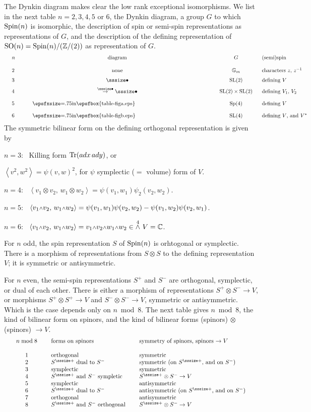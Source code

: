 The Dynkin diagram makes clear the low rank exceptional
isomorphisms.
We list in the next table $n=2,3,4,5$ or $6$, the Dynkin
diagram, a group $G$ to which $\text{\rm Spin}(n)$ is isomorphic,
the description of spin or semi-spin representations as
representations of $G$, and the description of the
defining representation of $\text{\rm SO}(n)=\text{\rm Spin}(n)/({\Bbb Z}/(2))$
as representation of $G$.
\def\bulletsatop{{\overset{\sssize\bullet}\to{\sssize\bullet}}}
$$
\vbox{
\tabskip=14pt
\halign to 6.5 true in{#\hfill &\hfill #\hfill  &\hfill #\hfill  
     &#\hfill &\hfill #\hfill \cr
$n$ &diagram &$G$  &(semi)spin &defining orthogonal\cr
\noalign{\bigskip}
$2$ &none &$\dbG_m$ &characters $z$, $z^{-1}$ 
  &$z^2\oplus z^{-2}$\cr
\noalign{\medskip}
$3$ &${\sssize\bullet}$ &$\SL(2)$ &defining $V$ &adjoint
$=\Sym^2(V)$\cr
\noalign{\medskip}
$4$ &$\bulletsatop$ &$\SL(2)\times \SL(2)$
     &defining $V_1$, $V_2$ &$V_1\otimes V_2$\cr
\noalign{\medskip}
$5$ &\vbox{\epsfxsize=.75in\epsfbox{table-figa.eps}}
  &$\Sp(4)$ &defining $V$ &$\wedgeop^{2}\,V$\cr
\noalign{\medskip}
6  &\vbox{\epsfxsize=.75in\epsfbox{table-figb.eps}}
  &$\SL(4)$ &defining $V$, and $V^*$
  &$\wedgeop^{2}\,V$\cr}}
$$
The symmetric bilinear form on the defining orthogonal
representation is given by

\medskip\noindent
$n=3$: \ Killing form $\text{\rm Tr}(adx\,ady)$, or

$\left<v^2,w^2\right>=\psi(v,w)^2$, for $\psi$ symplectic
 ($=$ volume) form of $V$.

\medskip\noindent
$n=4$: \ $\left<v_1\otimes v_2,\,w_1\otimes
w_2\right>=\psi(v_1,w_1)\psi_2(v_2,w_2)$.

\medskip\noindent
$n=5$: \ $\left<v_1\w v_2,\,w_1\w w_2\right>=
 \psi(v_1,w_1)\psi(v_2,w_2)-\psi(v_1,w_2)\psi(v_2,w_1)$.

\medskip\noindent
$n=6$: \ $\left<v_1\w v_2,\,w_1\w w_2\right>=
  v_1\w v_2\w w_1\w w_2\in\wedgeop^{4}\,V=\dbC$.

\medskip
For $n$ odd, the spin representation $S$ of $\text{\rm Spin}(n)$ is
orhtogonal or symplectic.
There is a morphism of representations from $S\otimes S$
to the defining representation $V$; it is symmetric or
antisymmetric.

For $n$ even, the semi-spin representations $S^{\plus}$
and $S^-$ are orthogonal, symplectic, or dual of each
other.
There is either a morphism of representations
$S^{\plus}\otimes S^-\to V$, or morphisms
$S^{\plus}\otimes S^{\plus}\to V$ and $S^-\otimes S^-\to
V$, symmetric or antisymmetric.
Which is the case depends only on $n\bmod{8}$.
The next table gives $n\bmod{8}$, the kind of bilinear
form on spinors, and the kind of bilinear forms (spinors)
$\otimes$ (spinors) $\to V$.
$$
\vbox{
\tabskip=20pt
\halign{\hfill #\hfill  &#\hfill &#\hfill\cr
$n\bmod{8}$ &forms on spinors &symmetry of spinors,
  spinors $\to V$\cr
\noalign{\bigskip}
1 &orthogonal &symmetric\cr
2 &$S^{\plus}$ dual to $S^-$ &symmetric (on $S^{\plus}$, 
  and on $S^-$)\cr
3 &symplectic &symmetric\cr
4 &$S^{\plus}$ and $S^-$ sympletic 
  &$S^{\plus}\otimes S^-\to V$\cr
5 &symplectic &antisymmetric\cr
6 &$S^{\plus}$ dual to $S^-$ &antisymmetric (on
  $S^{\plus}$, and on $S^-$)\cr
7 &orthogonal &antisymmetric\cr
8 &$S^{\plus}$ and $S^-$ orthogonal 
     &$S^{\plus}\otimes S^-\to V$\cr}}
$$

